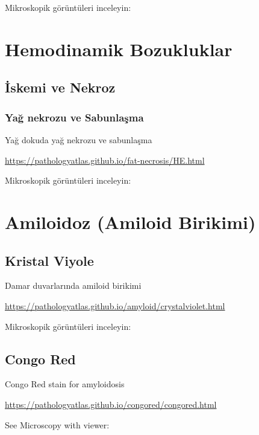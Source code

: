 \documentclass[
  letterpaper,
  DIV=11,
  numbers=noendperiod]{scrreprt}
\begin{document}
Mikroskopik görüntüleri inceleyin:

\hypertarget{hemodinamik-bozukluklar}{%
\chapter{Hemodinamik Bozukluklar}\label{hemodinamik-bozukluklar}}

\hypertarget{iskemi-ve-nekroz}{%
\section{İskemi ve Nekroz}\label{iskemi-ve-nekroz}}

\hypertarget{yaux11f-nekrozu-ve-sabunlaux15fma}{%
\subsection{Yağ nekrozu ve
Sabunlaşma}\label{yaux11f-nekrozu-ve-sabunlaux15fma}}

Yağ dokuda yağ nekrozu ve sabunlaşma

\url{https://pathologyatlas.github.io/fat-necrosis/HE.html}

Mikroskopik görüntüleri inceleyin:

\hypertarget{amiloidoz-amiloid-birikimi}{%
\chapter{Amiloidoz (Amiloid
Birikimi)}\label{amiloidoz-amiloid-birikimi}}

\hypertarget{kristal-viyole}{%
\section{Kristal Viyole}\label{kristal-viyole}}

Damar duvarlarında amiloid birikimi

\url{https://pathologyatlas.github.io/amyloid/crystalviolet.html}

Mikroskopik görüntüleri inceleyin:

\hypertarget{congo-red}{%
\section{Congo Red}\label{congo-red}}

Congo Red stain for amyloidosis

\url{https://pathologyatlas.github.io/congored/congored.html}

See Microscopy with viewer:
\end{document}
